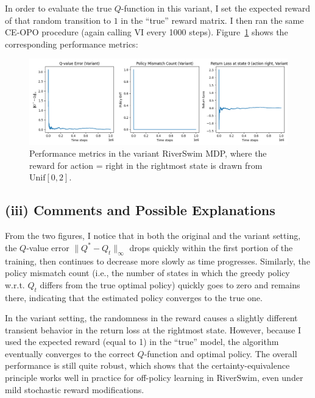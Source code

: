 In order to evaluate the true $Q$-function in this variant, I set the expected reward of that random transition 
to $1$ in the ``true'' reward matrix. I then ran the same CE-OPO procedure (again calling VI every 1000 steps). 
Figure~\ref{fig:variant} shows the corresponding performance metrics:

\begin{figure}[H]
    \centering
    \includegraphics[width=1\textwidth]{Code/RiverSwim_CE-OPO_Variant.png}
    \caption{Performance metrics in the variant RiverSwim MDP, where the reward for action = right 
    in the rightmost state is drawn from $\mathrm{Unif}[0,2]$.}
    \label{fig:variant}
\end{figure}

\subsection*{(iii) Comments and Possible Explanations}
From the two figures, I notice that in both the original and the variant setting, the $Q$-value error $\|Q^*-Q_t\|_\infty$ 
drops quickly within the first portion of the training, then continues to decrease more slowly as time progresses. 
Similarly, the policy mismatch count (i.e., the number of states in which the greedy policy w.r.t. $Q_t$ differs from 
the true optimal policy) quickly goes to zero and remains there, indicating that the estimated policy converges to 
the true one. 

In the variant setting, the randomness in the reward causes a slightly different transient behavior in the return 
loss at the rightmost state. However, because I used the expected reward (equal to 1) in the ``true'' model, the 
algorithm eventually converges to the correct $Q$-function and optimal policy. The overall performance is still 
quite robust, which shows that the certainty-equivalence principle works well in practice for off-policy learning 
in RiverSwim, even under mild stochastic reward modifications.